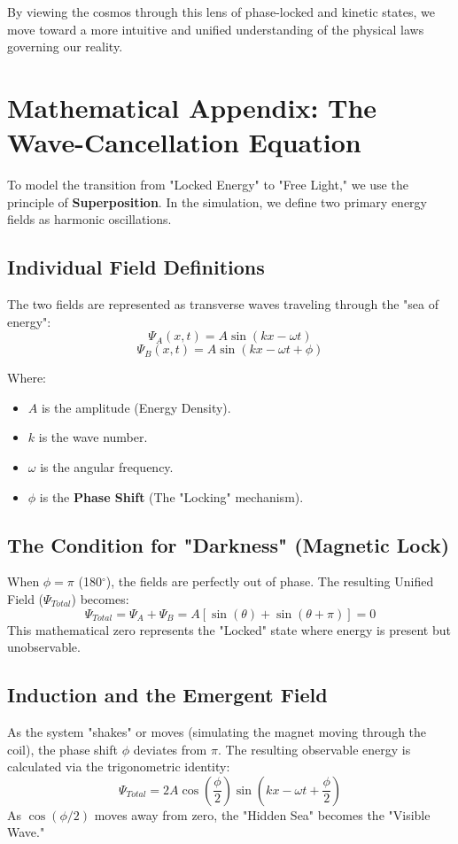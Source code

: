 \documentclass[11pt]{article}
\begin{document}
By viewing the cosmos through this lens of phase-locked and kinetic states, we move toward a more intuitive and unified understanding of the physical laws governing our reality.

\appendix
\section{Mathematical Appendix: The Wave-Cancellation Equation}

To model the transition from "Locked Energy" to "Free Light," we use the principle of \textbf{Superposition}. In the simulation, we define two primary energy fields as harmonic oscillations.

\subsection{Individual Field Definitions}
The two fields are represented as transverse waves traveling through the "sea of energy":
\begin{equation}
    \Psi_A(x, t) = A \sin(kx - \omega t)
\end{equation}
\begin{equation}
    \Psi_B(x, t) = A \sin(kx - \omega t + \phi)
\end{equation}

Where:
\begin{itemize}
    \item $A$ is the amplitude (Energy Density).
    \item $k$ is the wave number.
    \item $\omega$ is the angular frequency.
    \item $\phi$ is the \textbf{Phase Shift} (The "Locking" mechanism).
\end{itemize}

\subsection{The Condition for "Darkness" (Magnetic Lock)}
When $\phi = \pi$ (180$^\circ$), the fields are perfectly out of phase. The resulting Unified Field ($\Psi_{Total}$) becomes:
\begin{equation}
    \Psi_{Total} = \Psi_A + \Psi_B = A[\sin(\theta) + \sin(\theta + \pi)] = 0
\end{equation}
This mathematical zero represents the "Locked" state where energy is present but unobservable.

\subsection{Induction and the Emergent Field}
As the system "shakes" or moves (simulating the magnet moving through the coil), the phase shift $\phi$ deviates from $\pi$. The resulting observable energy is calculated via the trigonometric identity:
\begin{equation}
    \Psi_{Total} = 2A \cos\left(\frac{\phi}{2}\right) \sin\left(kx - \omega t + \frac{\phi}{2}\right)
\end{equation}
As $\cos(\phi/2)$ moves away from zero, the "Hidden Sea" becomes the "Visible Wave."
\end{document}
